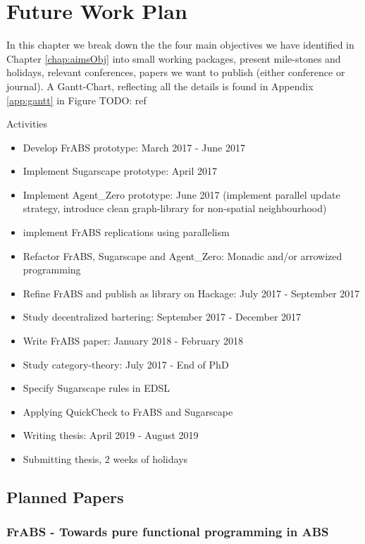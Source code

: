\chapter{Future Work Plan}
\label{chap:future}


In this chapter we break down the the four main objectives we have identified in Chapter \ref{chap:aimsObj} into small working packages, present mile-stones and holidays, relevant conferences, papers we want to publish (either conference or journal). A Gantt-Chart, reflecting all the details is found in Appendix \ref{app:gantt} in Figure TODO: ref

Activities
\begin{itemize}
\item Develop FrABS prototype: March 2017 - June 2017
\item Implement Sugarscape prototype: April 2017
\item Implement Agent\_Zero prototype: June 2017 (implement parallel update strategy, introduce clean graph-library for non-spatial neighbourhood)
\item implement FrABS replications using parallelism
\item Refactor FrABS, Sugarscape and Agent\_Zero: Monadic and/or arrowized programming
\item Refine FrABS and publish as library on Hackage: July 2017 - September 2017
\item Study decentralized bartering: September 2017 - December 2017
\item Write FrABS paper: January 2018 - February 2018
\item Study category-theory: July 2017 - End of PhD
\item Specify Sugarscape rules in EDSL
\item Applying QuickCheck to FrABS and Sugarscape
\item Writing thesis: April 2019 - August 2019
\item Submitting thesis, 2 weeks of holidays
\end{itemize}

\section{Planned Papers}
\subsection{FrABS - Towards pure functional programming in ABS}

